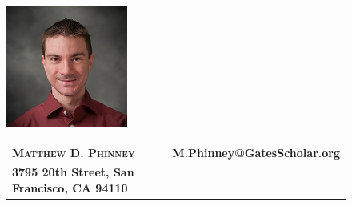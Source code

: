 \documentclass[letterpaper,11pt]{article}
\begin{document}
\renewcommand{\baselinestretch}{1}
 \normalsize

\newcommand{\mywebheader}{
\begin{figure}[!ht]
	\begin{minipage}[t]{.2\textwidth}
		\vspace{0pt}
    		\includegraphics[width=40mm]{Matt-Phinney-64.jpg}
   	 \end{minipage}\hfill
	\begin{minipage}[t]{.75\textwidth}
		\vspace{0pt}
    		\begin{tabular*}{4in}{l@{\extracolsep{\fill}}r}
      			\textbf{{\huge \textsc{{Matthew D. Phinney}}}} & {\textbf{{M.Phinney@GatesScholar.org}}}\\
      			{\textbf{{3795 20th Street, San Francisco, CA 94110}}} \\
      			
    		\end{tabular*}
    	\end{minipage}
\end{figure}
\vspace{0.15in}}

\mywebheader

\end{document}
